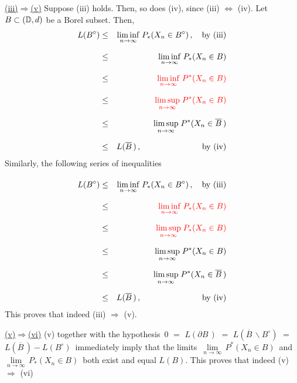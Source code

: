 \vskip 0.5cm \noindent
\underline{(iii)\;$\Longrightarrow$\;(v)}
\vskip 0.2cm \noindent
Suppose (iii) holds. Then, so does (iv), since (iii) $\Longleftrightarrow$ (iv).
Let $B \subset (\mathbb{D},d)$ be a Borel subset. Then,
\begin{eqnarray*}
L(B^{\circ})
& \leq &
	\underset{n\rightarrow\infty}{\liminf}\; P_{*}(X_{n} \in B^{\circ})\,,
	\quad\textnormal{by (iii)}
\\
& \overset{{\color{white}\vert}}{\leq} &
	\underset{n\rightarrow\infty}{\liminf}\; P_{*}(X_{n} \in B)
\\
& \overset{{\color{white}\vert}}{\leq} &
	{\color{red}\underset{n\rightarrow\infty}{\liminf}\; P^{*}(X_{n} \in B)}
\\
& \overset{{\color{white}\vert}}{\leq} &
	{\color{red}\underset{n\rightarrow\infty}{\limsup}\; P^{*}(X_{n} \in B)}
\\
& \overset{{\color{white}\vert}}{\leq} &
	\underset{n\rightarrow\infty}{\limsup}\; P^{*}(X_{n} \in \overline{B}\,)
\\
& \overset{{\color{white}\vert}}{\leq} &
	L(\overline{B}\,)\,,
	\quad\quad\quad\quad\quad\quad\quad\;\,
	\textnormal{by (iv)}
\end{eqnarray*}
Similarly, the following series of inequalities
\begin{eqnarray*}
L(B^{\circ})
& \overset{{\color{white}\vert}}{\leq} &
	\underset{n\rightarrow\infty}{\liminf}\; P_{*}(X_{n} \in B^{\circ})\,,
	\quad\textnormal{by (iii)}
\\
& \overset{{\color{white}\vert}}{\leq} &
	{\color{red}\underset{n\rightarrow\infty}{\liminf}\; P_{*}(X_{n} \in B)}
\\
& \overset{{\color{white}\vert}}{\leq} &
	{\color{red}\underset{n\rightarrow\infty}{\limsup}\; P_{*}(X_{n} \in B)}
\\
& \overset{{\color{white}\vert}}{\leq} &
	\underset{n\rightarrow\infty}{\limsup}\; P^{*}(X_{n} \in B)
\\
& \overset{{\color{white}\vert}}{\leq} &
	\underset{n\rightarrow\infty}{\limsup}\; P^{*}(X_{n} \in \overline{B}\,)
\\
& \overset{{\color{white}\vert}}{\leq} &
	L(\overline{B}\,)\,,
	\quad\quad\quad\quad\quad\quad\quad\;\,
	\textnormal{by (iv)}
\end{eqnarray*}
This proves that indeed (iii) $\Longrightarrow$ (v).

\vskip 0.5cm \noindent
\underline{(v)\;$\Longrightarrow$\;(vi)}
\vskip 0.2cm \noindent
(v) together with the hypothesis
\,$0$ $=$ $L(\partial B\,)$ $=$ $L(\overline{B}\,\backslash B^{\circ})$
$=$ $L(\overline{B}\,) - L(B^{\circ})$\,
immediately imply that the limits
\,$\underset{n\rightarrow\infty}{\lim}\, P^{*}(X_{n} \in B)$\,
and
\,$\underset{n\rightarrow\infty}{\lim}\, P_{*}(X_{n} \in B)$\,
both exist and equal $L(B)$.
This proves that indeed (v) $\Longrightarrow$ (vi)

